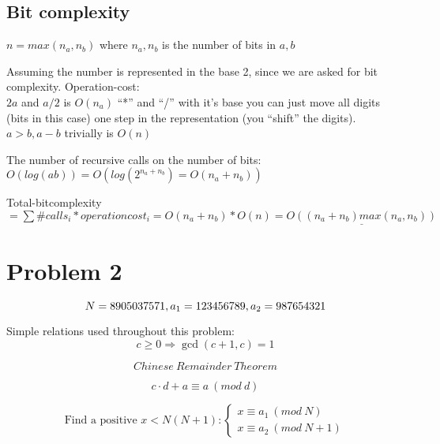 \documentclass[a4paper,twoside=false,abstract=false,numbers=noenddot,
titlepage=false,headings=small,parskip=half,version=last]{scrartcl}
\begin{document}
\subsection{Bit complexity}

$n=max(n_a,n_b)$ where $n_a,n_b$ is the number of bits in $a,b$

Assuming the number is represented in the base 2, since we are asked for bit complexity.
Operation-cost:\\ %
$2a$ and $a/2$ is $O(n_a)$ ``*'' and ``/'' with it's base you can just move all digits (bits in this case) one step in the representation (you ``shift'' the digits).\\ 
$a>b,a-b$ trivially is $O(n)$

The number of recursive calls on the number of bits: $O(log(ab))=O(log(2^{n_a+n_b})=O(n_a+n_b))$

Total-bitcomplexity $= \sum{\#{calls_i}*{operationcost_i}} = O(n_a+n_b)*O(n) = \underline{O((n_a+n_b)max(n_a,n_b))}$
\section{Problem 2}
\begin{equation*}
    N=8905037571, \\
    a_{1}=123456789, \\
    a_{2}=987654321
\end{equation*}


Simple relations used throughout this problem: 
\begin{equation} \label{eq:gcdplusone}
    c \ge 0 \Rightarrow  \gcd(c+1,c)=1
\end{equation}

\begin{equation} \label{eq:remaindertheo}
    Chinese\ Remainder\ Theorem
\end{equation}

\begin{equation} \label{eq:modrule}
    c\cdot d+a \equiv a\ (mod\ d) 
\end{equation}

\begin{equation} \label{eq:congruenceproblem}
    \text{Find a positive } x < N(N+1) : 
    \begin{cases}
        x \equiv a_{1}\ (mod\ N)\\
        x \equiv a_{2}\ (mod\ N+1)
    \end{cases}
\end{equation}
\end{document}
